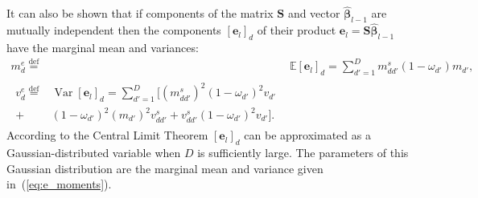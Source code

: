 \documentclass{article}
\begin{document}
 It can also be shown that if components of the matrix $\mathbf{S}$ and vector $\widehat{\boldsymbol\beta}_{l-1}$ are mutually independent then the components $[ \mathbf{e}_l ]_d$ of their product $\mathbf{e}_l = \mathbf{S} \widehat{\boldsymbol\beta}_{l-1}$ have the marginal mean and variances:
  \begin{subequations}
  \label{eq:e_moments}
  \begin{align}
  m^e_{d} \stackrel{\text{def}}{=} &\mathbb{E}[ \mathbf{e}_l ]_d = \sum_{d'=1}^D m^s_{dd'}(1-\omega_{d'})m_{d'}, \\
   \begin{split}
  v^e_{d} \stackrel{\text{def}}{=} &\operatorname{Var}[ \mathbf{e}_l ]_d = \sum_{d'=1}^D [(m^s_{dd'})^2(1-\omega_{d'})^2v_{d'} \\
   + &(1-\omega_{d'})^2(m_{d'})^2v^s_{dd'} + v^s_{dd'}(1-\omega_{d'})^2v_{d'}].
   \end{split}
   \end{align}
  \end{subequations}
According to the Central Limit Theorem $[ \mathbf{e}_l ]_d$ can be approximated as a Gaussian-distributed variable when $D$ is sufficiently large. The parameters of this Gaussian distribution are the marginal mean and variance given in~(\ref{eq:e_moments}).
  
\end{document}
